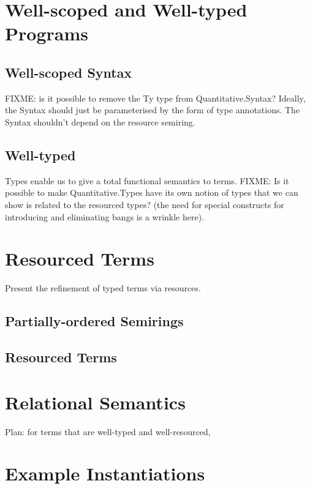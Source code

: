 \documentclass[sigplan,review]{acmart}\settopmatter{printfolios=true,printccs=false,printacmref=false}
\begin{document}
\section{Well-scoped and Well-typed Programs}

\subsection{Well-scoped Syntax}

FIXME: is it possible to remove the Ty type from Quantitative.Syntax?
Ideally, the Syntax should just be parameterised by the form of type
annotations. The Syntax shouldn't depend on the resource semiring.

\subsection{Well-typed}

Types enable us to give a total functional semantics to terms. FIXME:
Is it possible to make Quantitative.Types have its own notion of types
that we can show is related to the resourced types? (the need for
special constructs for introducing and eliminating bangs is a wrinkle
here).

\section{Resourced Terms}

Present the refinement of typed terms via resources.

\subsection{Partially-ordered Semirings}

\subsection{Resourced Terms}

\section{Relational Semantics}

Plan: for terms that are well-typed and well-resourced, 

\section{Example Instantiations}
\end{document}
